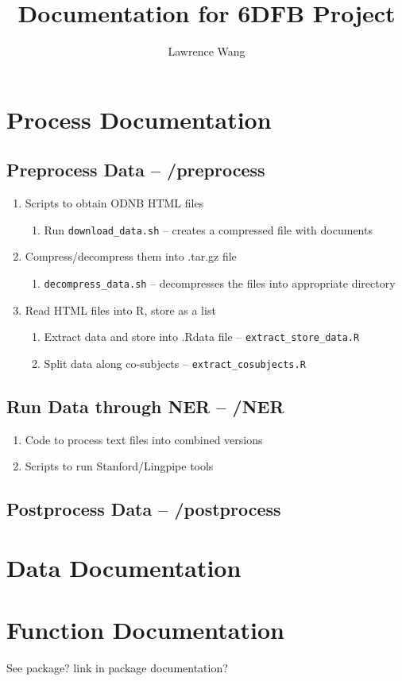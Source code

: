 \documentclass[11pt]{article}
\newcommand{\filename}[1]{ \texttt{#1}}
\begin{document}
\title{Documentation for 6DFB Project}
\author{Lawrence Wang}

\maketitle
\tableofcontents
\pagebreak

\section{Process Documentation}

\subsection{Preprocess Data -- /preprocess}

\begin{enumerate}
\item Scripts to obtain ODNB HTML files
\begin{enumerate}
\item Run \filename{download\_data.sh} -- creates a compressed file with documents
\end{enumerate}

\item Compress/decompress them into .tar.gz file
\begin{enumerate}
\item \filename{decompress\_data.sh} -- decompresses the files into appropriate directory
\end{enumerate}

\item Read HTML files into R, store as a list
\begin{enumerate}
\item Extract data and store into .Rdata file -- \filename{extract\_store\_data.R}
\item Split data along co-subjects -- \filename{extract\_cosubjects.R}
\end{enumerate}

\end{enumerate}


\subsection{Run Data through NER -- /NER}
\begin{enumerate}
\item Code to process text files into combined versions
\item Scripts to run Stanford/Lingpipe tools

\end{enumerate}


\subsection{Postprocess Data -- /postprocess}





\section{Data Documentation}



\section{Function Documentation}
See package? link in package documentation?
\end{document}
